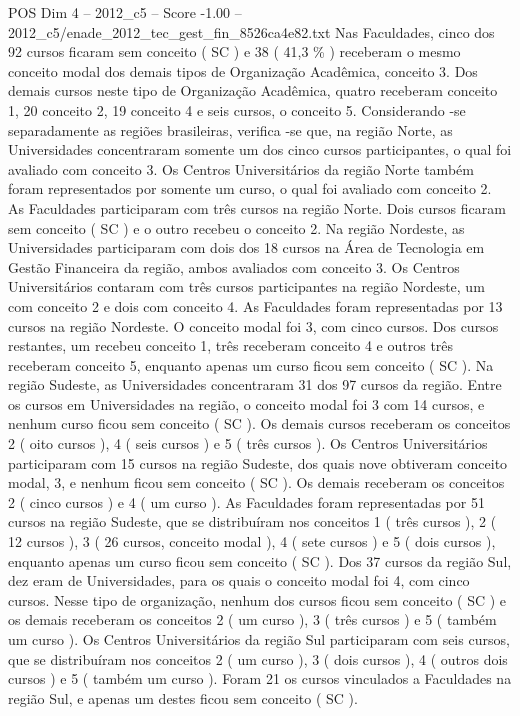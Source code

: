 \begin{textsample}{POS Dim 4 – 2012\_c5 – Score -1.00 – 2012\_c5/enade\_2012\_tec\_gest\_fin\_8526ca4e82.txt}
Nas Faculdades, cinco dos 92 cursos ficaram sem conceito ( SC ) e 38 ( 41,3 \% ) receberam o mesmo conceito modal dos demais tipos de Organização Acadêmica, conceito 3.
Dos demais cursos neste tipo de Organização Acadêmica, quatro receberam conceito 1, 20 conceito 2, 19 conceito 4 e seis cursos, o conceito 5.
Considerando -se separadamente as regiões brasileiras, verifica -se que, na região Norte, as Universidades concentraram somente um dos cinco cursos participantes, o qual foi avaliado com conceito 3.
Os Centros Universitários da região Norte também foram representados por somente um curso, o qual foi avaliado com conceito 2.
As Faculdades participaram com três cursos na região Norte.
Dois cursos ficaram sem conceito ( SC ) e o outro recebeu o conceito 2.
Na região Nordeste, as Universidades participaram com dois dos 18 cursos na Área de Tecnologia em Gestão Financeira da região, ambos avaliados com conceito 3.
Os Centros Universitários contaram com três cursos participantes na região Nordeste, um com conceito 2 e dois com conceito 4.
As Faculdades foram representadas por 13 cursos na região Nordeste.
O conceito modal foi 3, com cinco cursos.
Dos cursos restantes, um recebeu conceito 1, três receberam conceito 4 e outros três receberam conceito 5, enquanto apenas um curso ficou sem conceito ( SC ).
Na região Sudeste, as Universidades concentraram 31 dos 97 cursos da região.
Entre os cursos em Universidades na região, o conceito modal foi 3 com 14 cursos, e nenhum curso ficou sem conceito ( SC ).
Os demais cursos receberam os conceitos 2 ( oito cursos ), 4 ( seis cursos ) e 5 ( três cursos ).
Os Centros Universitários participaram com 15 cursos na região Sudeste, dos quais nove obtiveram conceito modal, 3, e nenhum ficou sem conceito ( SC ).
Os demais receberam os conceitos 2 ( cinco cursos ) e 4 ( um curso ).
As Faculdades foram representadas por 51 cursos na região Sudeste, que se distribuíram nos conceitos 1 ( três cursos ), 2 ( 12 cursos ), 3 ( 26 cursos, conceito modal ), 4 ( sete cursos ) e 5 ( dois cursos ), enquanto apenas um curso ficou sem conceito ( SC ).
Dos 37 cursos da região Sul, dez eram de Universidades, para os quais o conceito modal foi 4, com cinco cursos.
Nesse tipo de organização, nenhum dos cursos ficou sem conceito ( SC ) e os demais receberam os conceitos 2 ( um curso ), 3 ( três cursos ) e 5 ( também um curso ).
Os Centros Universitários da região Sul participaram com seis cursos, que se distribuíram nos conceitos 2 ( um curso ), 3 ( dois cursos ), 4 ( outros dois cursos ) e 5 ( também um curso ).
Foram 21 os cursos vinculados a Faculdades na região Sul, e apenas um destes ficou sem conceito ( SC ).

\end{textsample}
